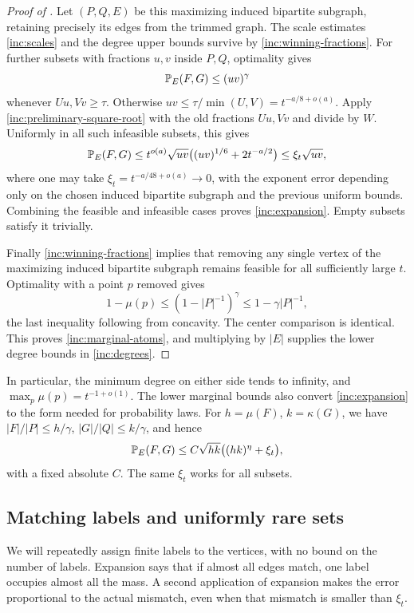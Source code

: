 \begin{proof}[Proof of ]
Let \((P,Q,E)\) be this maximizing induced bipartite subgraph, retaining precisely its
edges from the trimmed graph. The scale estimates
\eqref{inc:scales} and the degree upper bounds survive by
\eqref{inc:winning-fractions}. For further subsets with fractions
\(u,v\) inside \(P,Q\), optimality gives
\[
 \mathbb P_E(F,G)\le(uv)^\gamma
\]
whenever \(Uu,Vv\ge\tau\). Otherwise
\(uv\le\tau/\min(U,V)=t^{-a/8+o(a)}\). Apply
\eqref{inc:preliminary-square-root} with the old fractions \(Uu,Vv\)
and divide by \(W\). Uniformly in all such infeasible subsets, this
gives
\[
 \mathbb P_E(F,G)
 \le t^{o(a)}\sqrt{uv}
       \bigl((uv)^{1/6}+2t^{-a/2}\bigr)
 \le\xi_t\sqrt{uv},
\]
where one may take \(\xi_t=t^{-a/48+o(a)}\to0\), with the exponent
error depending only on the chosen induced bipartite subgraph and the previous uniform
bounds. Combining the feasible and infeasible cases proves
\eqref{inc:expansion}. Empty subsets satisfy it trivially.

Finally \eqref{inc:winning-fractions} implies that removing any single
vertex of the maximizing induced bipartite subgraph remains feasible for all sufficiently
large \(t\). Optimality with a point \(p\) removed gives
\[
 1-\mu(p)\le(1-|P|^{-1})^\gamma\le1-\gamma|P|^{-1},
\]
the last inequality following from concavity. The center comparison is
identical. This proves \eqref{inc:marginal-atoms}, and multiplying by
\(|E|\) supplies the lower degree bounds in \eqref{inc:degrees}.
\end{proof}

In particular, the minimum degree on either side tends to infinity,
and \(\max_p\mu(p)=t^{-1+o(1)}\). The lower marginal bounds also
convert \eqref{inc:expansion} to the form needed for probability laws.
For \(h=\mu(F)\), \(k=\kappa(G)\), we have
\(|F|/|P|\le h/\gamma\), \(|G|/|Q|\le k/\gamma\), and hence
\begin{equation}\label{inc:marginal-expansion}
 \mathbb P_E(F,G)\le C\sqrt{hk}\bigl((hk)^\eta+\xi_t\bigr),
\end{equation}
with a fixed absolute \(C\). The same \(\xi_t\) works for all subsets.

\subsection{Matching labels and uniformly rare sets}

We will repeatedly assign finite labels to the vertices, with no bound
on the number of labels. Expansion says that if almost all edges match,
one label occupies almost all the mass. A second application of
expansion makes the error proportional to the actual mismatch, even
when that mismatch is smaller than \(\xi_t\).

